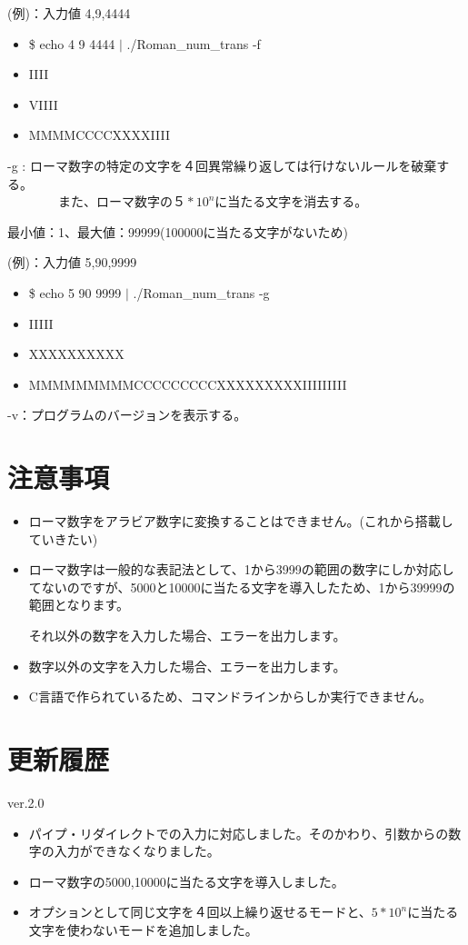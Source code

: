 \documentclass{jsarticle}
\begin{document}
{(例)：入力値 4,9,4444
\begin{itemize}
\item[] \$ echo 4 9 4444 $|$ ./Roman\_num\_trans -f
\item[] IIII
\item[] VIIII
\item[] MMMMCCCCXXXXIIII\\
\end{itemize}

-g : ローマ数字の特定の文字を４回異常繰り返しては行けないルールを破棄する。\\
~~~~~~~~また、ローマ数字の$５*10^n$に当たる文字を消去する。

最小値：1、最大値：99999(100000に当たる文字がないため)

(例)：入力値 5,90,9999
\begin{itemize}
\item[] \$ echo 5 90 9999 $|$ ./Roman\_num\_trans -g
\item[] IIIII
\item[] XXXXXXXXXX
\item[] MMMMMMMMMCCCCCCCCCXXXXXXXXXIIIIIIIII\\
\end{itemize}

-v：プログラムのバージョンを表示する。

\newpage
\section{注意事項}

\begin{itemize}
  \item ローマ数字をアラビア数字に変換することはできません。(これから搭載していきたい)
  \item ローマ数字は一般的な表記法として、1から3999の範囲の数字にしか対応してない\cite{roman_num}のですが、5000と10000に当たる文字\cite{roman_num2}を導入したため、1から39999の範囲となります。
  
  それ以外の数字を入力した場合、エラーを出力します。 
  \item 数字以外の文字を入力した場合、エラーを出力します。
  \item C言語で作られているため、コマンドラインからしか実行できません。  
\end{itemize}

\section{更新履歴}
ver.2.0
\begin{itemize}
  \item パイプ・リダイレクトでの入力に対応しました。そのかわり、引数からの数字の入力ができなくなりました。
  \item ローマ数字の5000,10000に当たる文字\cite{roman_num2}を導入しました。
  \item オプションとして同じ文字を４回以上繰り返せるモードと、$5*10^n$に当たる文字を使わないモードを追加しました。
\end{itemize}

}
\end{document}

